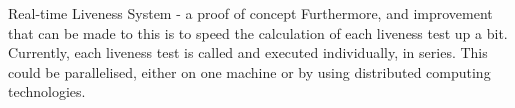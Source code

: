 \documentclass[final]{beamer}
\begin{document}
\begin{frame}{}
\begin{columns}[t]
\begin{column}{.48\linewidth}
\begin{block}{Real-time Liveness System - a proof of concept}
          Furthermore, and improvement that can be made to this is to speed the calculation of each liveness test up a bit. Currently, each liveness test is called and executed individually, in series. This could be parallelised,
          either on one machine or by using distributed computing technologies.
        \end{block}
        
      \end{column}
    \end{columns}


  \end{frame}
\end{document}
